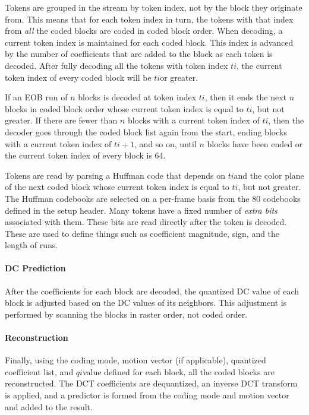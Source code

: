 \documentclass[11pt,letterpaper]{article}
\newcommand{\qi}{\ensuremath{\mathit{qi}}}
\newcommand{\ti}{\ensuremath{\mathit{ti}}}
\newcommand{\term}[1]{{\em #1}}
\begin{document}
Tokens are grouped in the stream by token index, not by the block they
 originate from.
This means that for each token index in turn, the tokens with that index from
 {\em all} the coded blocks are coded in coded block order.
When decoding, a current token index is maintained for each coded block.
This index is advanced by the number of coefficients that are added to the
 block as each token is decoded.
After fully decoding all the tokens with token index \ti, the current token
 index of every coded block will be \ti or greater.

If an EOB run of $n$ blocks is decoded at token index \ti, then it ends the
 next $n$ blocks in coded block order whose current token index is equal to
 \ti, but not greater.
If there are fewer than $n$ blocks with a current token index of \ti, then the
 decoder goes through the coded block list again from the start, ending blocks
 with a current token index of $\ti+1$, and so on, until $n$ blocks have been
 ended or the current token index of every block is 64.

Tokens are read by parsing a Huffman code that depends on \ti and the color
 plane of the next coded block whose current token index is equal to \ti, but
 not greater.
The Huffman codebooks are selected on a per-frame basis from the 80 codebooks
 defined in the setup header.
Many tokens have a fixed number of \term{extra bits} associated with them.
These bits are read directly after the token is decoded.
These are used to define things such as coefficient magnitude, sign, and the
 length of runs.

\paragraph{DC Prediction}

After the coefficients for each block are decoded, the quantized DC value of
 each block is adjusted based on the DC values of its neighbors.
This adjustment is performed by scanning the blocks in raster order, not coded
 order.

\paragraph{Reconstruction}

Finally, using the coding mode, motion vector (if applicable), quantized
 coefficient list, and \qi value defined for each block, all the coded blocks
 are reconstructed.
The DCT coefficients are dequantized, an inverse DCT transform is applied, and
 a predictor is formed from the coding mode and motion vector and added to the
 result.
\end{document}
